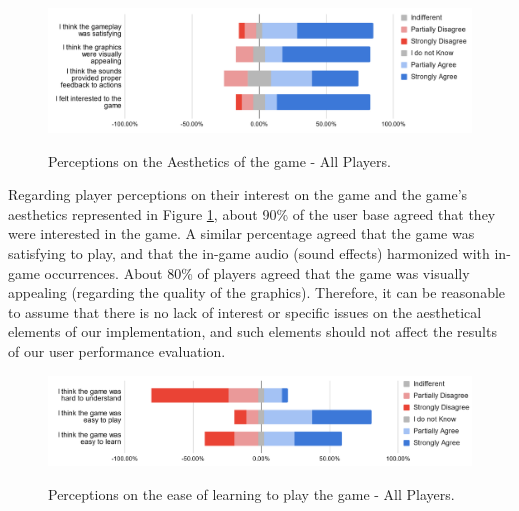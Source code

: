 \begin{figure}[!ht]
    \begin{center}
    \caption{Perceptions on the Aesthetics of the game - All Players.}
        \includegraphics[width=36em]{figures/fig-perception-aesthetics-all-players.png}
        \label{fig:perception-aesthetics-all-players}
    \end{center}
\end{figure}

Regarding player perceptions on their interest on the game and the game's aesthetics represented in Figure \ref{fig:perception-aesthetics-all-players}, about 90\% of the user base agreed that they were interested in the game. A similar percentage agreed that the game was satisfying to play, and that the in-game audio (sound effects) harmonized with in-game occurrences. About 80\% of players agreed that the game was visually appealing (regarding the quality of the graphics). Therefore, it can be reasonable to assume that there is no lack of interest or specific issues on the aesthetical elements of our implementation, and such elements should not affect the results of our user performance evaluation.

\begin{figure}[!ht]
    \begin{center}
    \caption{Perceptions on the ease of learning to play the game - All Players.}
        \includegraphics[width=36em]{figures/fig-perception-learning-all-players.png}
        \label{fig:perception-learning-all-players}
    \end{center}
\end{figure}

